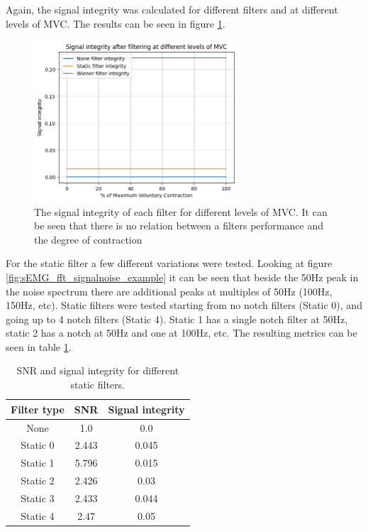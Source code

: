 Again, the signal integrity was calculated for different filters and at different levels of MVC. The results can be seen in figure \ref{fig:filter_signal_integrity_mvc}.

\begin{figure}[h!t]
	\begin{center}
		\includegraphics[height=60mm]{images/filter_signal_integrity_mvc.png}
	\end{center}
	\caption{The signal integrity of each filter for different levels of MVC. It can be seen that there is no relation between a filters performance and the degree of contraction}
	\label{fig:filter_signal_integrity_mvc}
\end{figure}

For the static filter a few different variations were tested. Looking at figure \ref{fig:sEMG_fft_signalnoise_example} it can be seen that beside the 50Hz peak in the noise spectrum there are additional peaks at multiples of 50Hz (100Hz, 150Hz, etc). Static filters were tested starting from no notch filters (Static 0), and going up to 4 notch filters (Static 4). Static 1 has a single notch filter at 50Hz, static 2 has a notch at 50Hz and one at 100Hz, etc. The resulting metrics can be seen in table \ref{tab:static_filter_snr_integrity}.

\begin{table} [h!]
    \begin{tabular}{c|c|c}
        Filter type & SNR & Signal integrity\\
        \hline
        None & 1.0 & 0.0\\
        Static 0 & 2.443 & 0.045\\
        Static 1 & 5.796 & 0.015\\
        Static 2 & 2.426 & 0.03\\
        Static 3 & 2.433 & 0.044\\
        Static 4 & 2.47 & 0.05\\
    \end{tabular}
    \caption{SNR and signal integrity for different static filters.}
    \label{tab:static_filter_snr_integrity}
\end{table}

